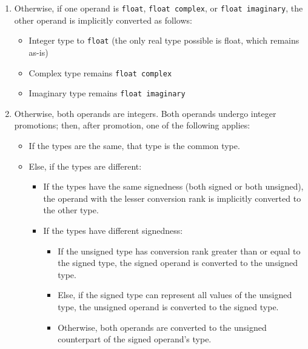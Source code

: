 \begin{enumerate}
    \item Otherwise, if one operand is \texttt{float}, \texttt{float complex}, or \texttt{float imaginary}, the other operand is implicitly converted as follows:
    \begin{itemize}
        \item Integer type to \texttt{float} (the only real type possible is float, which remains as-is)
        \item Complex type remains \texttt{float complex}
        \item Imaginary type remains \texttt{float imaginary}
    \end{itemize}

    \item Otherwise, both operands are integers. Both operands undergo integer promotions; then, after promotion, one of the following applies:
    \begin{itemize}
        \item If the types are the same, that type is the common type.
        \item Else, if the types are different:
        \begin{itemize}
            \item If the types have the same signedness (both signed or both unsigned), the operand with the lesser conversion rank is implicitly converted to the other type.
            \item If the types have different signedness:
            \begin{itemize}
                \item If the unsigned type has conversion rank greater than or equal to the signed type, the signed operand is converted to the unsigned type.
                \item Else, if the signed type can represent all values of the unsigned type, the unsigned operand is converted to the signed type.
                \item Otherwise, both operands are converted to the unsigned counterpart of the signed operand's type.
            \end{itemize}
        \end{itemize}
    \end{itemize}
\end{enumerate}